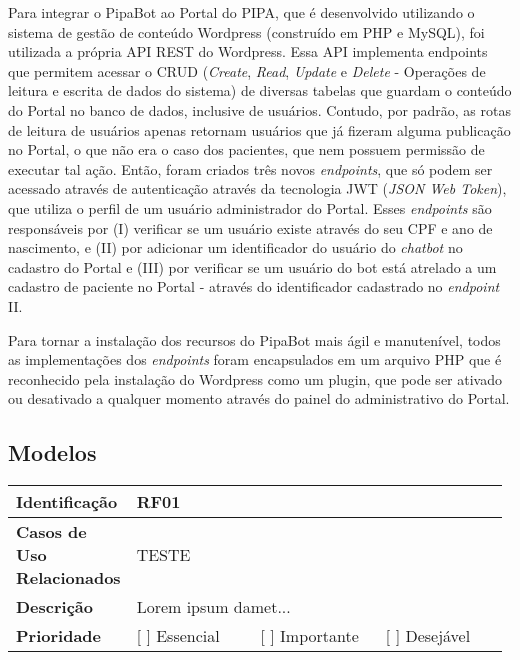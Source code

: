   Para integrar o PipaBot ao Portal do PIPA, que é desenvolvido utilizando o sistema de gestão de conteúdo Wordpress (construído em PHP e MySQL), foi utilizada a própria API REST do Wordpress. Essa API implementa endpoints que permitem acessar o CRUD (\textit{Create}, \textit{Read}, \textit{Update} e \textit{Delete} - Operações de leitura e escrita de dados do sistema) de diversas tabelas que guardam o conteúdo do Portal no banco de dados, inclusive de usuários. Contudo, por padrão, as rotas de leitura de usuários apenas retornam usuários que já fizeram alguma publicação no Portal, o que não era o caso dos pacientes, que nem possuem permissão de executar tal ação. Então, foram criados três novos \textit{endpoints}, que só podem ser acessado através de autenticação através da tecnologia JWT (\textit{JSON Web Token}), que utiliza o perfil de um usuário administrador do Portal. Esses \textit{endpoints} são responsáveis por (I) verificar se um usuário existe através do seu CPF e ano de nascimento, e (II) por adicionar um identificador do usuário do \textit{chatbot} no cadastro do Portal e (III) por verificar se um usuário do bot está atrelado a um cadastro de paciente no Portal - através do identificador cadastrado no \textit{endpoint} II. 
  
  Para tornar a instalação dos recursos do PipaBot mais ágil e manutenível, todos as implementações dos \textit{endpoints} foram encapsulados em um arquivo PHP que é reconhecido pela instalação do Wordpress como um plugin, que pode ser ativado ou desativado a qualquer momento através do painel do administrativo do Portal.
  
  \subsection{Modelos}
  	\begin{center}
  		\begin{tabular}{ | m{0.2\linewidth} | m{0.26\linewidth} | m{0.26\linewidth} | m{0.26\linewidth} | } 
  			\hline
  			\textbf{Identificação} & \multicolumn{3}{l|}{RF01}\\ 
  			\hline
  			\textbf{Casos de Uso Relacionados} & \multicolumn{3}{l|}{TESTE}\\ 
  			\hline
  			\textbf{Descrição} & \multicolumn{3}{l|}{Lorem ipsum damet...}\\ 
  			\hline
  			\textbf{Prioridade} & [ ] Essencial & [ ] Importante & [ ] Desejável \\
  			\hline
  		\end{tabular}
  	\end{center}
  
